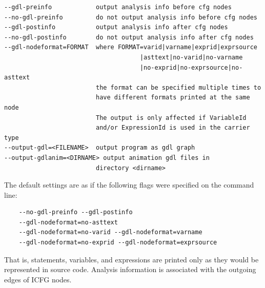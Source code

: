 \documentclass[a4paper,12pt]{report}
\begin{document}
{\footnotesize
\begin{verbatim}
--gdl-preinfo            output analysis info before cfg nodes
--no-gdl-preinfo         do not output analysis info before cfg nodes
--gdl-postinfo           output analysis info after cfg nodes
--no-gdl-postinfo        do not output analysis info after cfg nodes
--gdl-nodeformat=FORMAT  where FORMAT=varid|varname|exprid|exprsource
                                     |asttext|no-varid|no-varname
                                     |no-exprid|no-exprsource|no-asttext
                         the format can be specified multiple times to
                         have different formats printed at the same node
                         The output is only affected if VariableId
                         and/or ExpressionId is used in the carrier type
--output-gdl=<FILENAME>  output program as gdl graph
--output-gdlanim=<DIRNAME> output animation gdl files in 
                         directory <dirname>
\end{verbatim}
}

The default settings are as if the following flags were specified on the
command line:
{\footnotesize
\begin{verbatim}
    --no-gdl-preinfo --gdl-postinfo
    --gdl-nodeformat=no-asttext
    --gdl-nodeformat=no-varid --gdl-nodeformat=varname
    --gdl-nodeformat=no-exprid --gdl-nodeformat=exprsource
\end{verbatim}
}

That is, statements, variables, and expressions are printed only as they
would be represented in source code. Analysis information is associated with
the outgoing edges of ICFG nodes.
\end{document}
